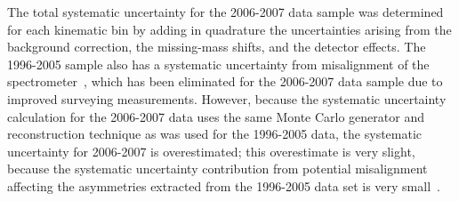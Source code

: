 \documentclass[11pt,a4paper]{article}
\begin{document}
The total systematic uncertainty for the 2006-2007 data sample was
determined for each kinematic bin by adding in quadrature the
  uncertainties arising from the background correction, the
  missing-mass shifts, and the detector effects.  The 1996-2005 sample also has a systematic uncertainty from misalignment of the spectrometer~\cite{Air09}, which has been eliminated for the 2006-2007 data sample due to improved
  surveying measurements. However, because the systematic uncertainty calculation for the 2006-2007 data uses the same Monte Carlo generator and reconstruction technique as was used for the 1996-2005 data, the systematic uncertainty for 2006-2007 is overestimated; this overestimate is very slight, because the systematic uncertainty contribution from potential misalignment affecting the asymmetries extracted from the 1996-2005 data set is very small~\cite{Bur10}.
\end{document}

